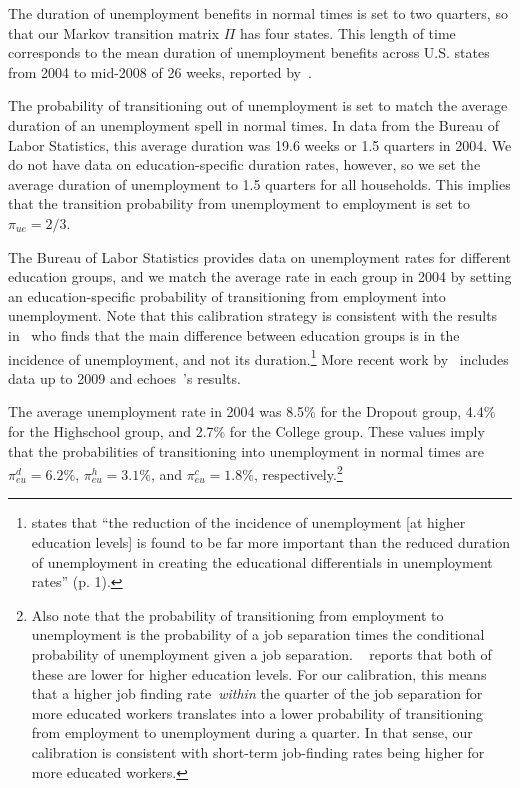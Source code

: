 \documentclass[qe,draft]{econsocart}
\theoremstyle{plain}
\theoremstyle{definition}
\begin{document}
The duration of unemployment benefits in normal times is set to two quarters, so that our Markov transition matrix $\Pi$ has four states.
This length of time corresponds to the mean duration of unemployment benefits across U.S.
states from 2004 to mid-2008 of 26 weeks, reported by~\cite{rothstein2017scraping}.

The probability of transitioning out of unemployment is set to match the average duration of an unemployment spell in normal times.
In data from the Bureau of Labor Statistics, this average duration was 19.6 weeks or 1.5 quarters in 2004. We do not have data on  education-specific duration rates, however, so we set the average duration of unemployment to 1.5 quarters for all households. This implies that the transition probability from unemployment to employment is set to $\pi_{ue}=2/3$.

The Bureau of Labor Statistics provides data on unemployment rates for different education groups, and we match the average rate in each group in 2004 by setting an education-specific probability of transitioning from employment into unemployment.
Note that this calibration strategy is consistent with the results in~\cite{mincer1991education} who finds that the main difference between education groups is in the incidence of unemployment, and not its duration.\footnote{\cite{mincer1991education} states that ``the reduction of the incidence of unemployment [at higher education levels] is found to be far more important than the reduced duration of unemployment in creating the educational differentials in unemployment rates'' (p. 1).} More recent work by~\cite{elsby2010labor} includes data up to 2009 and echoes~\citeauthor{mincer1991education}'s results.

The average unemployment rate in 2004 was 8.5\% for the Dropout group, 4.4\% for the Highschool group, and 2.7\% for the College group.
These values imply that the probabilities of transitioning into unemployment in normal times are $\pi_{eu}^d=6.2\%$, $\pi_{eu}^h=3.1\%$, and $\pi_{eu}^c=1.8\%$, respectively.\footnote{Also note that the probability of transitioning from employment to unemployment is the probability of a job separation times the conditional probability of unemployment given a job separation.
  ~\cite{mincer1991education} reports that both of these are lower for higher education levels.
  For our calibration, this means that a higher job finding rate~\textit{within} the quarter of the job separation for more educated workers translates	into a lower probability of transitioning from employment to unemployment during a quarter.
  In that sense, our calibration is consistent with short-term job-finding rates being higher for more educated workers.}
\end{document}

